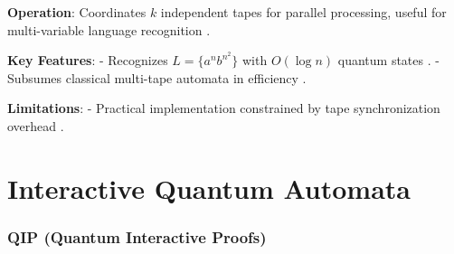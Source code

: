 \textbf{Operation}: Coordinates \( k \) independent tapes for parallel processing, useful for multi-variable language recognition \cite{zheng2012two}.

\textbf{Key Features}:
- Recognizes \( L = \{a^n b^{n^2}\} \) with \( O(\log n) \) quantum states \cite{zheng2012two}.
- Subsumes classical multi-tape automata in efficiency \cite{zheng2012two}.

\textbf{Limitations}: 
- Practical implementation constrained by tape synchronization overhead \cite{zheng2012two}.


\section{Interactive Quantum Automata}
\label{sec:interactive-quantum}

\subsubsection{QIP (Quantum Interactive Proofs)}
\label{sssec:qip}

